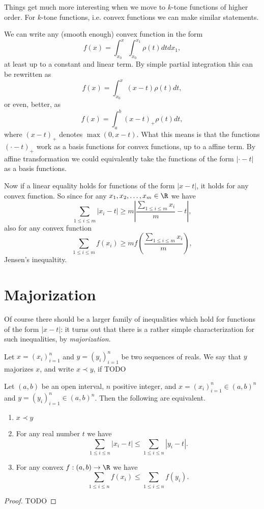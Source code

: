 Things get much more interesting when we move to $k$-tone functions of higher order. For $k$-tone functions, i.e. convex functions we can make similar statements.

We can write any (smooth enough) convex function in the form
\[
	f(x) = \int_{x_{0}}^{x} \int_{x_{0}}^{x_{1}} \rho(t) dt dx_{1},
\]
at least up to a constant and linear term. By simple partial integration this can be rewritten as
\[
	f(x) = \int_{x_{0}}^{x} (x - t) \rho(t) d t,
\]
or even, better, as
\[
	f(x) = \int_{a}^{b} (x - t)_{+} \rho(t) dt,
\]
where $(x - t)_{+}$ denotes $\max(0, x - t)$. What this means is that the functions $(\cdot - t)_{+}$ work as a basis functions for convex functions, up to a affine term. By affine transformation we could equivalently take the functions of the form $|\cdot - t|$ as a basis functions.

Now if a linear equality holds for functions of the form $|x - t|$, it holds for any convex function. So since for any $x_{1}, x_{2}, \ldots, x_{m} \in \R$ we have
\[
	\sum_{1 \leq i \leq m} |x_{i} - t| \geq m |\frac{\sum_{1 \leq i \leq m} x_{i}}{m} - t|,
\]
also for any convex function
\[
	\sum_{1 \leq i \leq m} f(x_{i}) \geq m f\left(\frac{\sum_{1 \leq i \leq m} x_{i}}{m}\right),
\]
Jensen's inequaltity.

\section{Majorization}

Of course there should be a larger family of inequalities which hold for functions of the form $|x - t|$: it turns out that there is a rather simple characterization for such inequalities, by \textit{majorization}.

\begin{maar}
	Let $x = (x_{i})_{i = 1}^{n}$ and $y = (y_{i})_{i = 1}^{n}$ be two sequences of reals. We say that $y$ majorizes $x$, and write $x \prec y$, if TODO
\end{maar}

\begin{lause}
	Let $(a, b)$ be an open interval, $n$ positive integer, and $x = (x_{i})_{i = 1}^{n} \in (a, b)^{n}$ and $y = (y_{i})_{i = 1}^{n} \in (a, b)^{n}$. Then the following are equivalent.
	\begin{enumerate}
		\item $x \prec y$
		\item For any real number $t$ we have
		\[
			\sum_{1 \leq i \leq n} |x_{i} - t| \leq \sum_{1 \leq i \leq n} |y_{i} - t|.
		\]
		\item For any convex $f : (a, b) \to \R$ we have
		\[
			\sum_{1 \leq i \leq n} f(x_{i}) \leq \sum_{1 \leq i \leq n} f(y_{i}).
		\]
	\end{enumerate}
\end{lause}
\begin{proof}
	TODO
\end{proof}

